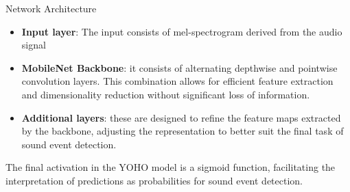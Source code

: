	
	\begin{frame}{Network Architecture}
		\begin{itemize}
			\item \textbf{Input layer}: The input consists of mel-spectrogram derived from the audio signal	
			\item \textbf{MobileNet Backbone}:  it consists of alternating depthwise and pointwise convolution layers. This combination allows for efficient feature extraction and dimensionality reduction without significant loss of information.
			\item \textbf{Additional layers}: these are designed to refine the feature maps extracted by the backbone, adjusting the representation to better suit the final task of sound event detection.
		\end{itemize} 
		
		The final activation in the YOHO model is a sigmoid function, facilitating the interpretation of predictions as probabilities for sound event detection.
		
		\note{
			\dots
		}
	\end{frame}
	
